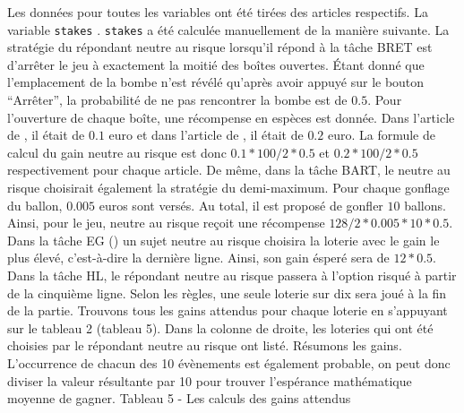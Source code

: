 \documentclass[12pt]{article}
\begin{document}
Les données pour toutes les variables ont été tirées des articles
respectifs. La variable \texttt{stakes} . \texttt{stakes} a été calculée
manuellement de la manière suivante. La stratégie du répondant neutre au
risque lorsqu'il répond à la tâche BRET est d'arrêter le jeu à
exactement la moitié des boîtes ouvertes. Étant donné que l'emplacement
de la bombe n'est révélé qu'après avoir appuyé sur le bouton
``Arrêter'', la probabilité de ne pas rencontrer la bombe est de
\(0.5\). Pour l'ouverture de chaque boîte, une récompense en espèces est
donnée. Dans l'article de \citet{Crosetto2013}, il était de \(0.1\) euro
et dans l'article de \citet{Crosetto2016}, il était de \(0.2\) euro. La
formule de calcul du gain neutre au risque est donc
\(0.1 * 100 / 2 * 0.5\) et \(0.2 * 100 / 2 * 0.5\) respectivement pour
chaque article. De même, dans la tâche BART, le neutre au risque
choisirait également la stratégie du demi-maximum. Pour chaque gonflage
du ballon, \(0.005\) euros sont versés. Au total, il est proposé de
gonfler \(10\) ballons. Ainsi, pour le jeu, neutre au risque reçoit une
récompense \(128 / 2 * 0.005 * 10 * 0.5\). Dans la tâche EG
(\citet{Crosetto2016}) un sujet neutre au risque choisira la loterie
avec le gain le plus élevé, c'est-à-dire la dernière ligne. Ainsi, son
gain ésperé sera de \(12 * 0.5\). Dans la tâche HL, le répondant neutre
au risque passera à l'option risqué à partir de la cinquième ligne.
Selon les règles, une seule loterie sur dix sera joué à la fin de la
partie. Trouvons tous les gains attendus pour chaque loterie en
s'appuyant sur le tableau 2 (tableau 5). Dans la colonne de droite, les
loteries qui ont été choisies par le répondant neutre au risque ont
listé. Résumons les gains. L'occurrence de chacun des 10 évènements est
également probable, on peut donc diviser la valeur résultante par 10
pour trouver l'espérance mathématique moyenne de gagner. \newpage
Tableau 5 - Les calculs des gains attendus
\end{document}
